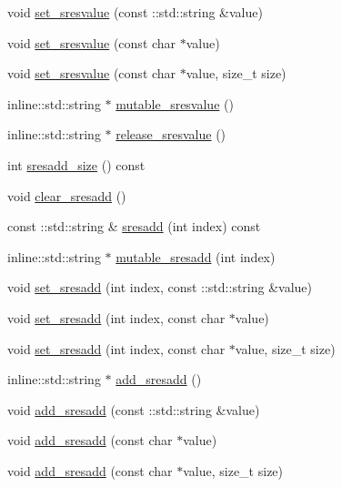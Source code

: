 \begin{DoxyCompactItemize}
\item 
void \hyperlink{classResponse_a8faacf8fe43b1aab3d790e6716ef278f}{set\-\_\-sresvalue} (const \-::std\-::string \&value)
\item 
void \hyperlink{classResponse_abe0e83c04d75ba0637d61e83b383b71b}{set\-\_\-sresvalue} (const char $\ast$value)
\item 
void \hyperlink{classResponse_a443e2c45dbaf1f2155ff1299242c5a73}{set\-\_\-sresvalue} (const char $\ast$value, size\-\_\-t size)
\item 
inline\-::std\-::string $\ast$ \hyperlink{classResponse_a08d015b4ff3ccbebc893c22f4131650c}{mutable\-\_\-sresvalue} ()
\item 
inline\-::std\-::string $\ast$ \hyperlink{classResponse_a4cc6be942c0b1217e973ed1ced76dc1e}{release\-\_\-sresvalue} ()
\item 
int \hyperlink{classResponse_a330c2cd0cf991be73309de9e4a7e215a}{sresadd\-\_\-size} () const 
\item 
void \hyperlink{classResponse_a3b54fb6d3258647e59ed85101d62a565}{clear\-\_\-sresadd} ()
\item 
const \-::std\-::string \& \hyperlink{classResponse_ac6c6bdabbc287b89d3bf2776bdc9d0dc}{sresadd} (int index) const 
\item 
inline\-::std\-::string $\ast$ \hyperlink{classResponse_aaf6ecb383beae9c23c13dc48b427d27d}{mutable\-\_\-sresadd} (int index)
\item 
void \hyperlink{classResponse_af0271c86201fafc5b89b2aae927fdf6c}{set\-\_\-sresadd} (int index, const \-::std\-::string \&value)
\item 
void \hyperlink{classResponse_a32ccac3e9a5b43038cebdaf2455d0ec4}{set\-\_\-sresadd} (int index, const char $\ast$value)
\item 
void \hyperlink{classResponse_ac46ce07388ab6136987260377d3fa17b}{set\-\_\-sresadd} (int index, const char $\ast$value, size\-\_\-t size)
\item 
inline\-::std\-::string $\ast$ \hyperlink{classResponse_a7da1994e6c0a3a5101263cd8ee9f6996}{add\-\_\-sresadd} ()
\item 
void \hyperlink{classResponse_a6209fcdf9b50601910aa61de7e12341d}{add\-\_\-sresadd} (const \-::std\-::string \&value)
\item 
void \hyperlink{classResponse_a7bae559e07358ac976477d08fdbc4a91}{add\-\_\-sresadd} (const char $\ast$value)
\item 
void \hyperlink{classResponse_a17af643e57bbd2aa99e27a3d4d699f8b}{add\-\_\-sresadd} (const char $\ast$value, size\-\_\-t size)

\end{DoxyCompactItemize}

